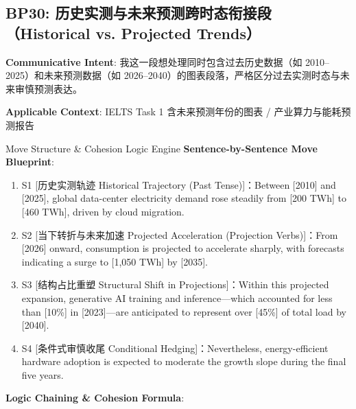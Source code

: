 \subsection{BP30: 历史实测与未来预测跨时态衔接段（Historical vs. Projected Trends）}\label{sec:bp:BP30}
\noindent\textbf{\color{AcadNavy}Communicative Intent}: 我这一段想处理同时包含过去历史数据（如 2010--2025）和未来预测数据（如 2026--2040）的图表段落，严格区分过去实测时态与未来审慎预测表达。\par\vspace{2pt}
\noindent\textbf{\color{AcadSlate}Applicable Context}: IELTS Task 1 含未来预测年份的图表 / 产业算力与能耗预测报告\par\vspace{4pt}
\begin{ConceptBox}{Move Structure \& Cohesion Logic Engine}
\textbf{Sentence-by-Sentence Move Blueprint}:
\begin{enumerate}[label=\textbf{\color{AcadNavy}S\arabic*.}, leftmargin=2em, itemsep=2pt]
  \item S1 [历史实测轨迹 Historical Trajectory (Past Tense)]：Between [2010] and [2025], global data-center electricity demand rose steadily from [200 TWh] to [460 TWh], driven by cloud migration.
  \item S2 [当下转折与未来加速 Projected Acceleration (Projection Verbs)]：From [2026] onward, consumption is projected to accelerate sharply, with forecasts indicating a surge to [1,050 TWh] by [2035].
  \item S3 [结构占比重塑 Structural Shift in Projections]：Within this projected expansion, generative AI training and inference---which accounted for less than [10\%] in [2023]---are anticipated to represent over [45\%] of total load by [2040].
  \item S4 [条件式审慎收尾 Conditional Hedging]：Nevertheless, energy-efficient hardware adoption is expected to moderate the growth slope during the final five years.
\end{enumerate}\par\vspace{4pt}
\textbf{Logic Chaining \& Cohesion Formula}:\par{}
\end{ConceptBox}
